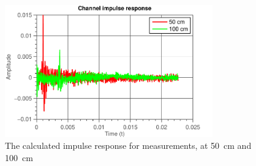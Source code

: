 \documentclass[11pt,titlepage]{report}
\begin{document}
\begin{figure}[H]
	\centering
	\includegraphics[width=0.8\textwidth]{../../deliverable-7-resources/figures/ass-1/report-14-15/ass-1-report-14-impulse-responses.pdf}
	\caption{The calculated impulse response for measurements, at \SI{50}{cm} and \SI{100}{cm}}
	\label{fig:rep14-impulse}
\end{figure}
\end{document}

